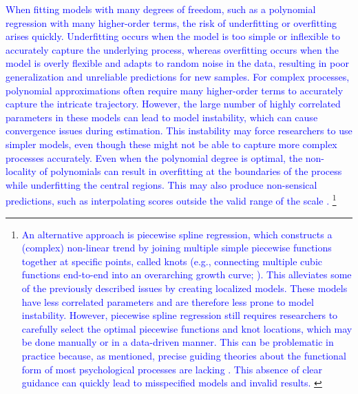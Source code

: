 \documentclass[man, floatsintext]{apa7}
\begin{document}
\textcolor{blue}{
  When fitting models with many degrees of freedom, such as a polynomial
  regression with many higher-order terms, the risk of underfitting or
  overfitting arises quickly. Underfitting occurs when the model is too simple
  or inflexible to accurately capture the underlying process, whereas
  overfitting occurs when the model is overly flexible and adapts to random
  noise in the data, resulting in poor generalization and unreliable
  predictions for new samples. For complex processes, polynomial approximations
  often require many higher-order terms to accurately capture the intricate
  trajectory. However, the large number of highly correlated parameters in
  these models can lead to model instability, which can cause convergence
  issues during estimation. This instability may force researchers to use
  simpler models, even though these might not be able to capture more complex
  processes accurately. Even when
  the polynomial degree is optimal, the non-locality of polynomials can result
  in overfitting at the boundaries of the process while underfitting the
  central regions. This may also produce non-sensical predictions, such as
  interpolating scores outside the valid range of the scale
  \parencite{magee_nonlocal_1998, boyd_divergence_2009, harrell_general_2001,
    jianan_case_2023}.
}\footnote{\textcolor{blue}{
    An alternative approach is piecewise spline regression, which
    constructs a
    (complex) non-linear trend by joining multiple simple piecewise functions
    together at specific points, called knots (e.g., connecting multiple cubic
    functions end-to-end into an overarching growth curve;
    \textcite{tsay_nonlinear_2019}). \textcolor{blue}{This alleviates some of
      the
      previously described issues by creating localized models. These models
      have
      less correlated parameters and are therefore less prone to model
      instability.
      However, piecewise spline regression still requires researchers to
      carefully
      select the optimal piecewise functions and knot locations, which may be
      done
      manually or in a data-driven manner}. This can be problematic in practice
    because, as mentioned, precise guiding theories about the functional form
    of
    most psychological processes are lacking \parencite{tan_time-varying_2011}.
    This absence of clear guidance can quickly lead to misspecified models and
    invalid results.
  }
}
\end{document}
